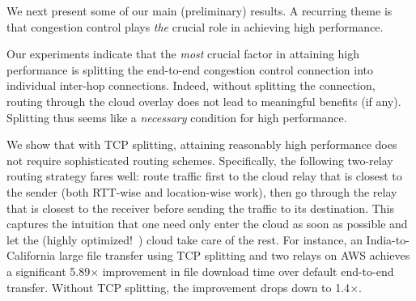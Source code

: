 \documentclass{hotnets17}
\newcommand{\mycomm}[3]{{\color{#2} \textbf{[#1: #3]}}}
\newcommand{\mycomm}[3]{}
\newcommand{\IK}[1]{\mycomm{IK}{blue}{#1}}
\newcommand{\NR}[1]{\mycomm{NR}{OliveGreen}{#1}}
\newcommand{\EZ}[1]{\mycomm{EZ}{BlueGreen}{#1}}
\begin{document}

We next present some of our main (preliminary) results. A recurring theme is that congestion control plays \emph{the} crucial role in achieving high performance.

\vspace{0.05in} Our experiments indicate that the \emph{most} crucial factor in attaining high performance is splitting the end-to-end congestion control connection into individual inter-hop connections. Indeed, without splitting the connection, routing through the cloud overlay does not lead to meaningful benefits (if any). Splitting thus seems like a \emph{necessary} condition for high performance. 

\vspace{0.05in} We show that with TCP splitting, attaining reasonably high performance does not require sophisticated routing schemes. Specifically, the following two-relay routing strategy fares well: route traffic first to the cloud relay that is closest to the sender (both RTT-wise and location-wise work), then go through the relay that is closest to the receiver before sending the traffic to its destination. This captures the intuition that one need only enter the cloud as soon as possible and let the (highly optimized!~\cite{pretium,B4,one-hop,cgn2017,unusual,multidimensional}) cloud take care of the rest. 
For instance, an India-to-California large file transfer using TCP splitting and two relays on AWS %
achieves a significant 5.89$\times$ improvement in file download time over default end-to-end transfer. Without TCP splitting, the improvement drops down to 1.4$\times$.  
\end{document}
